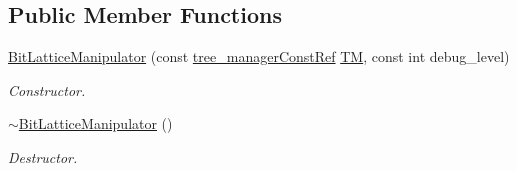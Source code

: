 \subsection*{Public Member Functions}
\begin{DoxyCompactItemize}
\item 
\hyperlink{classBitLatticeManipulator_a17e7c6938897e42d193caab62b84a8de}{Bit\+Lattice\+Manipulator} (const \hyperlink{tree__manager_8hpp_a792e3f1f892d7d997a8d8a4a12e39346}{tree\+\_\+manager\+Const\+Ref} \hyperlink{classBitLatticeManipulator_a473b1053ef1f3426a9895c4d604f6aad}{TM}, const int debug\+\_\+level)
\begin{DoxyCompactList}\small\item\em Constructor. \end{DoxyCompactList}\item 
\hyperlink{classBitLatticeManipulator_a299037063b6c527561af4021f65685d8}{$\sim$\+Bit\+Lattice\+Manipulator} ()
\begin{DoxyCompactList}\small\item\em Destructor. \end{DoxyCompactList}\end{DoxyCompactItemize}
